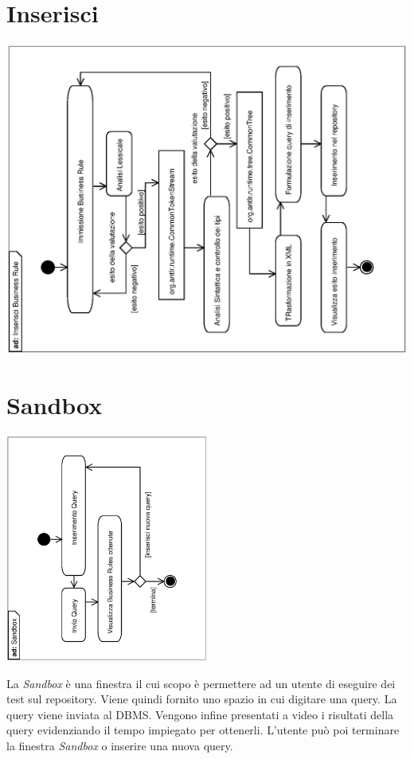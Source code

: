 \documentclass[11pt,titlepage,a4paper]{report}
\begin{document}
\section{Inserisci \br}
\begin{center}
 \includegraphics[width=1\textwidth, angle=-90]{InserisciBusinessRule.eps}
\end{center}


\section{Sandbox}
\begin{center}
 \includegraphics[width=0.5\textwidth, angle=-90]{Sandbox.eps}
\end{center}
La \textit{Sandbox} \`e una finestra il cui scopo \`e permettere ad un utente di eseguire dei test sul repository. Viene quindi fornito uno spazio in cui digitare una query. La query viene inviata al DBMS. Vengono infine presentati a video i risultati della query evidenziando il tempo impiegato per ottenerli. L'utente pu\`o poi terminare la finestra \textit{Sandbox} o inserire una nuova query.
\end{document}
